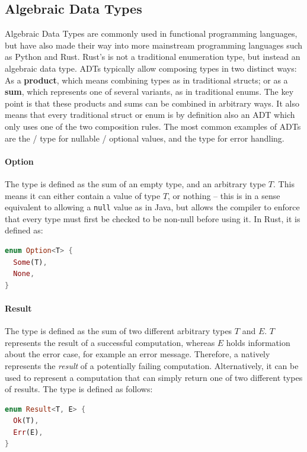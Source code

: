 \subsection{Algebraic Data Types}
Algebraic Data Types are commonly used in functional programming languages, but have also made their way into more mainstream programming languages such as Python and Rust. Rust's  is not a traditional enumeration type, but instead an algebraic data type. ADTs typically allow composing types in two distinct ways: As a \textbf{product}, which means combining types as in traditional structs; or as a \textbf{sum}, which represents one of several variants, as in traditional enums. The key point is that these products and sums can be combined in arbitrary ways. It also means that every traditional struct or enum is by definition also an ADT which only uses one of the two composition rules. The most common examples of ADTs are the  /  type for nullable / optional values, and the  type for error handling.

\paragraph{Option}
The  type is defined as the sum of an empty type, and an arbitrary type $T$. This means it can either contain a value of type $T$, or nothing -- this is in a sense equivalent to allowing a \lstinline{null} value as in Java, but allows the compiler to enforce that every  type must first be checked to be non-null before using it. In Rust, it is defined as:
\begin{lstlisting}[language=Rust, style=boxed]
enum Option<T> {
  Some(T),
  None,
}
\end{lstlisting}

\paragraph{Result}
The  type is defined as the sum of two different arbitrary types $T$ and $E$. $T$ represents the result of a successful computation, whereas $E$ holds information about the error case, for example an error message. Therefore, a  natively represents the \textit{result} of a potentially failing computation. Alternatively, it can be used to represent a computation that can simply return one of two different types of results. The type is defined as follows:
\begin{lstlisting}[language=Rust, style=boxed]
enum Result<T, E> {
  Ok(T),
  Err(E),
}
\end{lstlisting}

